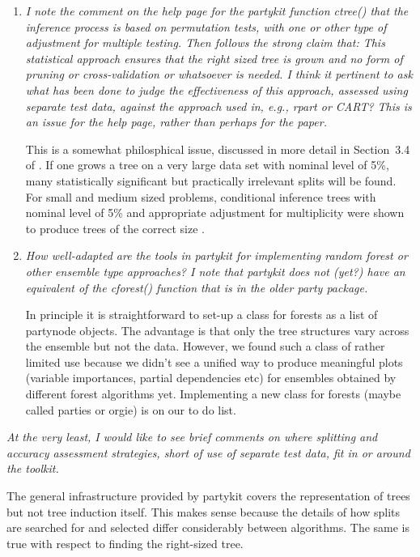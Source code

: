 \documentclass{article}
\begin{document}
\begin{enumerate}
\item 
\textit{
I note the comment on the help page for the partykit function ctree() that
the inference process is based on permutation tests, with one or other type
of adjustment for multiple testing.  Then follows the strong claim that:
This statistical approach ensures that the right sized tree is grown and no
form of pruning or cross-validation or whatsoever is needed.  I think it
pertinent to ask what has been done to judge the effectiveness of this
approach, assessed using separate test data, against the approach used in,
e.g., rpart or CART?  This is an issue for the help page, rather than
perhaps for the paper.}

This is a somewhat philosphical issue, discussed in more detail in
Section~3.4 of \cite{Hothorn+Hornik+Zeileis:2006}. If one grows a tree
on a very large data set with nominal level of 5\%, many statistically
significant but practically irrelevant splits will be found. For small and
medium sized problems, conditional inference trees with nominal level of 5\% 
and appropriate adjustment for multiplicity were shown to produce trees
of the correct size \citep[simulation results
in][]{Hothorn+Hornik+Zeileis:2006}.

\item 
\textit{
How well-adapted are the tools in partykit for implementing random forest
or other ensemble type approaches? I note that partykit does not (yet?) have
an equivalent of the cforest() function that is in the older party package.
}

In principle it is straightforward to set-up a class for forests as a list
of partynode objects. The advantage is that only the tree
structures vary across the ensemble but not the data. However, we found such
a class of rather limited use because we didn't see a unified way to produce
meaningful plots (variable importances, partial dependencies etc) for
ensembles obtained by different forest algorithms yet. Implementing a new
class for forests (maybe called parties or orgie) is on our to do list.

\end{enumerate}

\textit{
At the very least, I would like to see brief comments on where splitting and
accuracy assessment strategies, short of use of separate test data, fit in
or around the toolkit.}  

The general infrastructure provided by partykit covers the representation of
trees but not tree induction itself. This makes sense because the details of
how splits are searched for and selected differ considerably between
algorithms. The same is true with respect to finding the right-sized tree.
\end{document}
